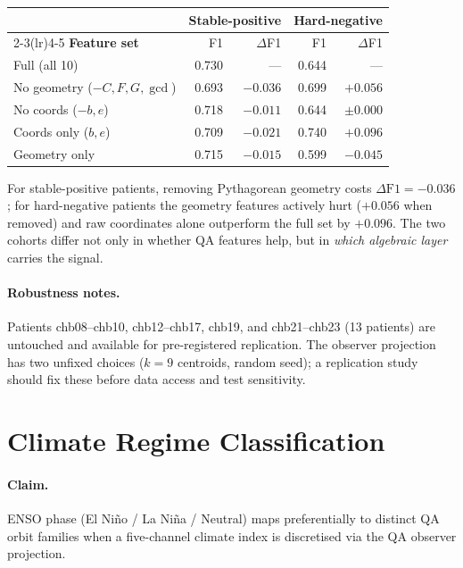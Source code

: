 \documentclass[11pt]{article}
\begin{document}
\begin{center}
\small
\begin{tabular}{lrrrr}
\toprule
& \multicolumn{2}{c}{\textbf{Stable-positive}} & \multicolumn{2}{c}{\textbf{Hard-negative}} \\
\cmidrule(lr){2-3}\cmidrule(lr){4-5}
\textbf{Feature set} & F1 & $\Delta$F1 & F1 & $\Delta$F1 \\
\midrule
Full (all 10)               & 0.730 & ---      & 0.644 & --- \\
No geometry ($-C,F,G,\gcd$) & 0.693 & $-0.036$ & 0.699 & $+0.056$ \\
No coords ($-b,e$)          & 0.718 & $-0.011$ & 0.644 & $\pm0.000$ \\
Coords only ($b,e$)         & 0.709 & $-0.021$ & 0.740 & $+0.096$ \\
Geometry only               & 0.715 & $-0.015$ & 0.599 & $-0.045$ \\
\bottomrule
\end{tabular}
\end{center}

For stable-positive patients, removing Pythagorean geometry costs
$\Delta\text{F1} = -0.036$; for hard-negative patients the geometry
features actively hurt ($+0.056$ when removed) and raw coordinates
alone outperform the full set by $+0.096$.
The two cohorts differ not only in whether QA features help, but in
\emph{which algebraic layer} carries the signal.

\paragraph{Robustness notes.}
Patients chb08--chb10, chb12--chb17, chb19, and chb21--chb23 (13 patients)
are untouched and available for pre-registered replication.
The observer projection has two unfixed choices ($k=9$ centroids, random seed);
a replication study should fix these before data access and test sensitivity.

\section{Climate Regime Classification}\label{sec:climate}

\paragraph{Claim.}
ENSO phase (El Ni\~no / La Ni\~na / Neutral) maps preferentially to distinct QA orbit
families when a five-channel climate index is discretised via the QA observer projection.
\end{document}

